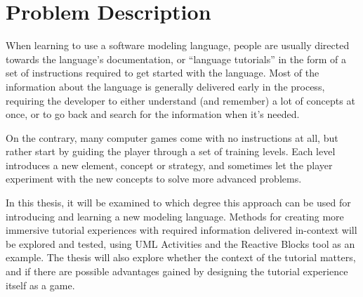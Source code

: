 \chapter*{Problem Description}
When learning to use a software modeling language, people are usually directed towards the language's documentation, or ``language tutorials'' in the form of a set of instructions required to get started with the language. Most of the information about the language is generally delivered early in the process, requiring the developer to either understand (and remember) a lot of concepts at once, or to go back and search for the information when it's needed.

\noindent
On the contrary, many computer games come with no instructions at all, but rather start by guiding the player through a set of training levels. Each level introduces a new element, concept or strategy, and sometimes let the player experiment with the new concepts to solve more advanced problems.

\noindent
In this thesis, it will be examined to which degree this approach can be used for introducing and learning a new modeling language. Methods for creating more immersive tutorial experiences with required information delivered in-context will be explored and tested, using UML Activities and the Reactive Blocks tool as an example. The thesis will also explore whether the context of the tutorial matters, and if there are possible advantages gained by designing the tutorial experience itself as a game.